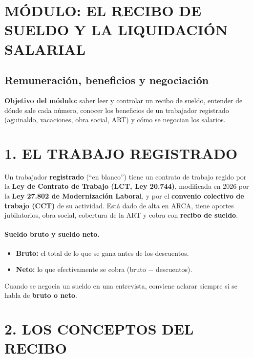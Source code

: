 \clearpage
\section*{MÓDULO: EL RECIBO DE SUELDO Y LA LIQUIDACIÓN SALARIAL}
\subsection*{Remuneración, beneficios y negociación}

\begin{recuadro}
\textbf{Objetivo del módulo:} saber leer y controlar un recibo de sueldo, entender de dónde
sale cada número, conocer los beneficios de un trabajador registrado (aguinaldo, vacaciones,
obra social, ART) y cómo se negocian los salarios.
\end{recuadro}

\section*{1. EL TRABAJO REGISTRADO}

Un trabajador \textbf{registrado} (``en blanco'') tiene un contrato de trabajo regido por la
\textbf{Ley de Contrato de Trabajo (LCT, Ley 20.744)}, modificada en 2026 por la
\textbf{Ley 27.802 de Modernización Laboral}, y por el \textbf{convenio colectivo de trabajo
(CCT)} de su actividad. Está dado de alta en ARCA, tiene aportes jubilatorios, obra social,
cobertura de la ART y cobra con \textbf{recibo de sueldo}.

\paragraph*{Sueldo bruto y sueldo neto.}
\begin{itemize}
  \item \textbf{Bruto:} el total de lo que se gana antes de los descuentos.
  \item \textbf{Neto:} lo que efectivamente se cobra (bruto $-$ descuentos).
\end{itemize}
Cuando se negocia un sueldo en una entrevista, conviene aclarar siempre si se habla de
\textbf{bruto o neto}.

\section*{2. LOS CONCEPTOS DEL RECIBO}

